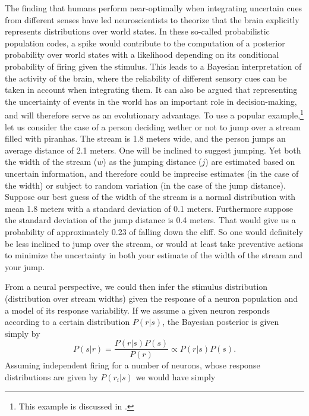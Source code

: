 \par
The finding that humans perform near-optimally when integrating uncertain cues from different senses have led neuroscientists to theorize that the brain explicitly represents distributions over world states.\cite{Ernst2002,Ma2006} In these so-called probabilistic population codes, a spike would contribute to the computation of a posterior probability over world states with a likelihood depending on its conditional probability of firing given the stimulus. This leads to a Bayesian interpretation of the activity of the brain, where the reliability of different sensory cues can be taken in account when integrating them. It can also be argued that representing the uncertainty of events in the world has an important role in decision-making, and will therefore serve as an evolutionary advantage. To use a popular example,\footnote{This example is discussed in \citep{Ma2006}.} let us consider the case of a person deciding wether or not to jump over a stream filled with piranhas. The stream is 1.8 meters wide, and the person jumps an average distance of 2.1 meters. One will be inclined to suggest jumping. Yet both the width of the stream ($w$) as the jumping distance ($j$) are estimated based on uncertain information, and therefore could be imprecise estimates (in the case of the width) or subject to random variation (in the case of the jump distance). Suppose our best guess of the width of the stream is a normal distribution with mean 1.8 meters with a standard deviation of 0.1 meters. Furthermore suppose the standard deviation of the jump distance is 0.4 meters. That would give us a probability of approximately 0.23 of falling down the cliff. So one would definitely be less inclined to jump over the stream, or would at least take preventive actions to minimize the uncertainty in both your estimate of the width of the stream and your jump.\par
From a neural perspective, we could then infer the stimulus distribution (distribution over stream widths) given the response of a neuron population and a model of its response variability. If we assume a given neuron responds according to a certain distribution $P(r|s)$, the Bayesian posterior is given simply by
\[
P(s|r) = \frac{P(r|s) P(s)}{P(r)} \propto P(r|s) P(s).
\]
Assuming independent firing for a number of neurons, whose response distributions are given by $P(r_i|s)$ we would have simply
